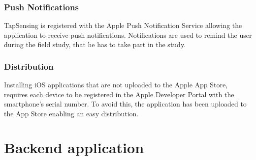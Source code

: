 \subsubsection{Push Notifications}
TapSensing is registered with the Apple Push Notification Service allowing the application to receive push notifications. Notifications are used to remind the user during the field study, that he has to take part in the study.
\subsubsection{Distribution}
Installing iOS applications that are not uploaded to the Apple App Store, requires each device to be registered in the Apple Developer Portal with the smartphone's serial number. To avoid this, the application has been uploaded to the App Store enabling an easy distribution.

\section{Backend application}
\label{sec:backend}
